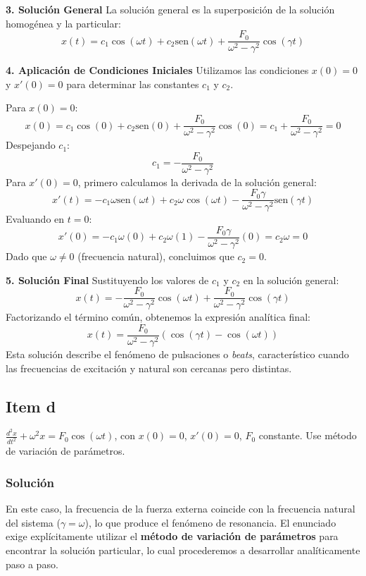 \documentclass[a4paper]{article}
\begin{document}
\textbf{3. Solución General}
La solución general es la superposición de la solución homogénea y la particular:
$$
x(t) = c_1 \cos(\omega t) + c_2 \text{sen}(\omega t) + \frac{F_0}{\omega^2 - \gamma^2} \cos(\gamma t)
$$

\textbf{4. Aplicación de Condiciones Iniciales}
Utilizamos las condiciones $x(0)= 0$ y $x'(0)= 0$ para determinar las constantes $c_1$ y $c_2$.

Para $x(0) = 0$:
$$
x(0) = c_1 \cos(0) + c_2 \text{sen}(0) + \frac{F_0}{\omega^2 - \gamma^2} \cos(0) = c_1 + \frac{F_0}{\omega^2 - \gamma^2} = 0
$$
Despejando $c_1$:
$$
c_1 = -\frac{F_0}{\omega^2 - \gamma^2}
$$
Para $x'(0) = 0$, primero calculamos la derivada de la solución general:
$$
x'(t) = -c_1 \omega \text{sen}(\omega t) + c_2 \omega \cos(\omega t) - \frac{F_0 \gamma}{\omega^2 - \gamma^2} \text{sen}(\gamma t)
$$
Evaluando en $t = 0$:
$$
x'(0) = -c_1 \omega (0) + c_2 \omega (1) - \frac{F_0 \gamma}{\omega^2 - \gamma^2} (0) = c_2 \omega = 0
$$
Dado que $\omega \neq 0$ (frecuencia natural), concluimos que $c_2 = 0$.

\textbf{5. Solución Final}
Sustituyendo los valores de $c_1$ y $c_2$ en la solución general:
$$
x(t) = -\frac{F_0}{\omega^2 - \gamma^2} \cos(\omega t) + \frac{F_0}{\omega^2 - \gamma^2} \cos(\gamma t)
$$
Factorizando el término común, obtenemos la expresión analítica final:
$$
x(t) = \frac{F_0}{\omega^2 - \gamma^2} (\cos(\gamma t) - \cos(\omega t))
$$
Esta solución describe el fenómeno de pulsaciones o \textit{beats}, característico cuando las frecuencias de excitación y natural son cercanas pero distintas.

\subsection{Item d}
$\frac{d^2 x}{dt^2} + \omega^2 x = F_0 \cos(\omega t)$, con $x(0)= 0$, $x'(0)= 0$, $F_0$ constante. Use método de variación de parámetros.

\subsubsection{Solución}
En este caso, la frecuencia de la fuerza externa coincide con la frecuencia natural del sistema ($\gamma = \omega$), lo que produce el fenómeno de resonancia. El enunciado exige explícitamente utilizar el \textbf{método de variación de parámetros} para encontrar la solución particular, lo cual procederemos a desarrollar analíticamente paso a paso.
\end{document}
